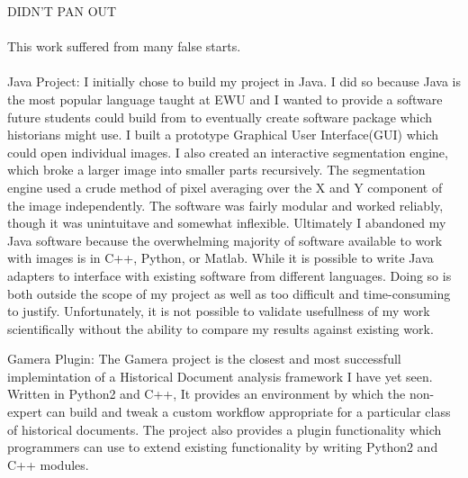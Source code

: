 DIDN'T PAN OUT\\
\\
This work suffered from many false starts.\\
\\
Java Project:  I initially chose to build my project in Java. I did so because Java is the most popular language taught at EWU and I wanted to provide a software future students could build from to eventually create software package which historians might use. I built a prototype Graphical User Interface(GUI) which could open individual images. I also created an interactive segmentation engine, which broke a larger image into smaller parts recursively. The segmentation engine used a crude method of pixel averaging over the X and Y component of the image independently. The software was fairly modular and worked reliably, though it was unintuitave and somewhat inflexible. Ultimately I abandoned my Java software because the overwhelming majority of software available to work with images is in C++, Python, or Matlab. While it is possible to write Java adapters to interface with existing software from different languages. Doing so is both outside the scope of my project as well as too difficult and time-consuming to justify. Unfortunately, it is not possible to validate usefullness of my work scientifically without the ability to compare my results against existing work.


Gamera Plugin:  The Gamera project is the closest and most successfull implemintation of a Historical Document analysis framework I have yet seen. Written in Python2 and C++, It provides an environment by which the non-expert can build and tweak a custom workflow appropriate for a particular class of historical documents. The project also provides a plugin functionality which programmers can use to extend existing functionality by writing Python2 and C++ modules.

\newpage
